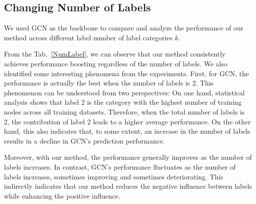 \begin{table}[!ht]
    \centering
    \caption{Performance (AUC) comparison under inductive setting.}
    \label{inductive}
\end{table}

\subsection{Changing Number of Labels}

 We used GCN as the backbone to compare and analyze the performance of our method across different label number of label categories $k$.

 From the Tab.~\ref{NumLabel}, we can observe that our method consistently achieves performance boosting regardless of the number of labels. We also identified some interesting phenomena from the experiments. First, for GCN, the performance is actually the best when the number of labels is 2. This phenomenon can be understood from two perspectives:
On one hand, statistical analysis shows that label 2 is the category with the highest number of training nodes across all training datasets. Therefore, when the total number of labels is 2, the contribution of label 2 leads to a higher average performance. On the other hand, this also indicates that, to some extent, an increase in the number of labels results in a decline in GCN’s prediction performance.

Moreover, with our method, the performance generally improves as the number of labels increases. In contrast, GCN’s performance fluctuates as the number of labels increases, sometimes improving and sometimes deteriorating. This indirectly indicates that our method reduces the negative influence between labels while enhancing the positive influence. 

